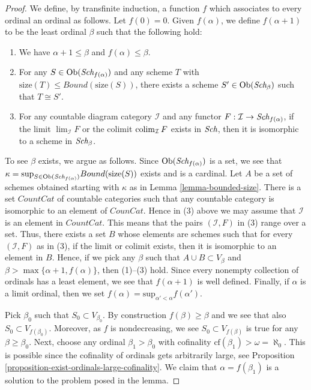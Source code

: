 \begin{proof}
We define, by transfinite induction, a function $f$ which associates
to every ordinal an ordinal as follows. Let $f(0) = 0$.
Given $f(\alpha)$, we define $f(\alpha + 1)$ to be the least
ordinal $\beta$ such that the following hold:
\begin{enumerate}
\item We have $\alpha + 1 \leq \beta$ and $f(\alpha) \leq \beta$.
\item For any $S \in \mathop{\rm Ob}\nolimits(\textit{Sch}_{f(\alpha)})$ and any
scheme $T$ with $\text{size}(T) \leq Bound(\text{size}(S))$,
there exists a scheme $S' \in \mathop{\rm Ob}\nolimits(\textit{Sch}_\beta)$
such that $T \cong S'$.
\item For any countable diagram category $\mathcal{I}$ and
any functor $F : \mathcal{I} \to \textit{Sch}_{f(\alpha)}$, if
the limit $\lim_\mathcal{I} F$ or the colimit
$\mathop{\rm colim}\nolimits_{\mathcal{I}} F$ exists in $\textit{Sch}$,
then it is isomorphic to a scheme in $\textit{Sch}_\beta$.
\end{enumerate}
To see $\beta$ exists, we argue as follows. Since
$\mathop{\rm Ob}\nolimits(\textit{Sch}_{f(\alpha)})$ is a set, we see that
$\kappa =
\text{sup}_{S \in \mathop{\rm Ob}\nolimits(\textit{Sch}_{f(\alpha)})} Bound(\text{size}(S))$
exists and is a cardinal.
Let $A$ be a set of schemes obtained starting with $\kappa$
as in Lemma \ref{lemma-bounded-size}.
There is a set $CountCat$ of countable
categories such that any countable category is isomorphic to
an element of $CounCat$. Hence in (3) above we may assume
that $\mathcal{I}$ is an element in $CountCat$. This means that
the pairs $(\mathcal{I}, F)$ in (3) range over a set.
Thus, there exists a set $B$ whose elements are schemes
such that for every $(\mathcal{I}, F)$ as in (3), if the
limit or colimit exists, then it is isomorphic to an element in $B$.
Hence, if we pick any $\beta$ such that $A \cup B \subset V_\beta$
and $\beta > \max\{\alpha + 1, f(\alpha)\}$, then (1)--(3) hold.
Since every nonempty collection of ordinals has a least element,
we see that $f(\alpha + 1)$ is well defined. Finally, if $\alpha$
is a limit ordinal, then we set
$f(\alpha) = \text{sup}_{\alpha' < \alpha} f(\alpha')$.

\medskip\noindent
Pick $\beta_0$ such that $S_0 \subset V_{\beta_0}$.
By construction $f(\beta) \geq \beta$ and we see that
also $S_0 \subset V_{f(\beta_0)}$. Moreover, as $f$ is
nondecreasing, we see $S_0 \subset V_{f(\beta)}$ is true for any
$\beta \geq \beta_0$. 
Next, choose any ordinal $\beta_1 > \beta_0$ with cofinality
$\text{cf}(\beta_1) > \omega = \aleph_0$. This is possible
since the cofinality of ordinals gets arbitrarily large, see
Proposition \ref{proposition-exist-ordinals-large-cofinality}.
We claim that
$\alpha = f(\beta_1)$ is a solution to the problem posed in the lemma.


\end{proof}
